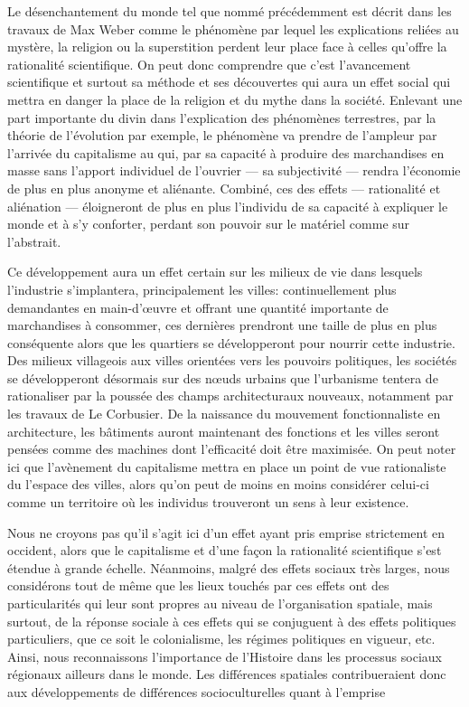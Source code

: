 Le désenchantement du monde tel que nommé précédemment est décrit dans les travaux de Max Weber comme le phénomène par lequel les explications reliées au mystère, la religion ou la superstition perdent leur place face à celles qu'offre la rationalité scientifique. 
On peut donc comprendre que c'est l'avancement scientifique et surtout sa méthode et ses découvertes qui aura un effet social qui mettra en danger la place de la religion et du mythe dans la société. 
Enlevant une part importante du divin dans l'explication des phénomènes terrestres, par la théorie de l'évolution par exemple, le phénomène va prendre de l'ampleur par l'arrivée du capitalisme au  qui, par sa capacité à produire des marchandises en masse sans l'apport individuel de l'ouvrier --- sa subjectivité --- rendra l'économie de plus en plus anonyme et aliénante. 
Combiné, ces des effets --- rationalité et aliénation --- éloigneront de plus en plus l'individu de sa capacité à expliquer le monde et à s'y conforter, perdant son pouvoir sur le matériel comme sur l'abstrait.

Ce développement aura un effet certain sur les milieux de vie dans lesquels l'industrie s'implantera, principalement les villes: continuellement plus demandantes en main-d’œuvre et offrant une quantité importante de marchandises à consommer, ces dernières prendront une taille de plus en plus conséquente alors que les quartiers se développeront pour nourrir cette industrie. 
Des milieux villageois aux villes orientées vers les pouvoirs politiques, les sociétés se développeront désormais sur des nœuds urbains que l'urbanisme tentera de rationaliser par la poussée des champs architecturaux nouveaux, notamment par les travaux de Le Corbusier. 
De la naissance du mouvement fonctionnaliste en architecture, les bâtiments auront maintenant des fonctions et les villes seront pensées comme des machines dont l'efficacité doit être maximisée\missref{}. 
On peut noter ici que l'avènement du capitalisme mettra en place un point de vue rationaliste du l'espace des villes, alors qu'on peut de moins en moins considérer celui-ci comme un territoire où les individus trouveront un sens à leur existence.

Nous ne croyons pas qu'il s'agit ici d'un effet ayant pris emprise strictement en occident, alors que le capitalisme et d'une façon la rationalité scientifique s'est étendue à grande échelle. 
Néanmoins, malgré des effets sociaux très larges, nous considérons tout de même que les lieux touchés par ces effets ont des particularités qui leur sont propres au niveau de l'organisation spatiale, mais surtout, de la réponse sociale à ces effets qui se conjuguent à des effets politiques particuliers, que ce soit le colonialisme, les régimes politiques en vigueur, etc. 
Ainsi, nous reconnaissons l'importance de l'Histoire dans les processus sociaux régionaux ailleurs dans le monde. 
Les différences spatiales contribueraient donc aux développements de différences socioculturelles quant à l'emprise 


